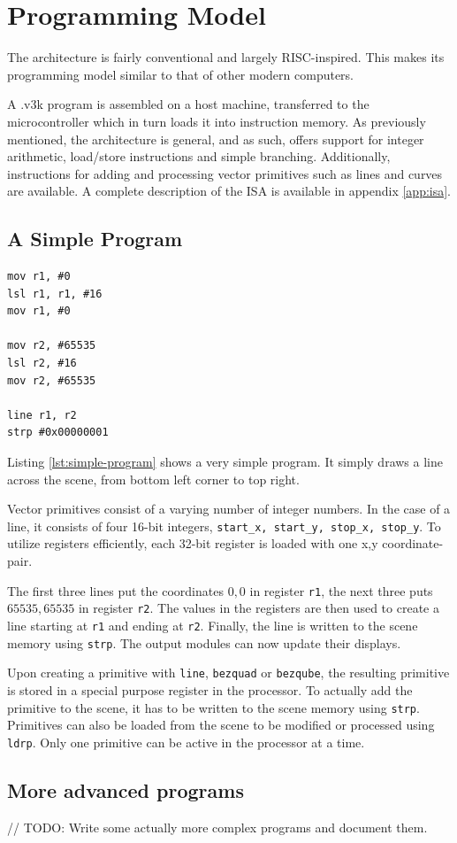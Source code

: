 \section{Programming Model}

The \vthreek architecture is fairly conventional and largely RISC-inspired.
This makes its programming model similar to that of other modern computers.

A .v3k program is assembled on a host machine, transferred to the microcontroller which in turn loads it into instruction memory.
As previously mentioned, the \vthreek architecture is general, and as such, offers support for integer arithmetic, load/store instructions and simple branching.
Additionally, instructions for adding and processing vector primitives such as lines and curves are available.
A complete description of the \vthreek ISA is available in appendix \ref{app:isa}.

\subsection{A Simple \vthreek Program}

\begin{lstlisting}[label=lst:simple-program]
mov r1, #0
lsl r1, r1, #16
mov r1, #0

mov r2, #65535
lsl r2, #16
mov r2, #65535

line r1, r2
strp #0x00000001
\end{lstlisting}

Listing \ref{lst:simple-program} shows a very simple \vthreek program.
It simply draws a line across the scene, from bottom left corner to top right.

Vector primitives consist of a varying number of integer numbers.
In the case of a line, it consists of four 16-bit integers, \texttt{start\_x, start\_y, stop\_x, stop\_y}.
To utilize registers efficiently, each 32-bit register is loaded with one x,y coordinate-pair.

The first three lines put the coordinates $0,0$ in register \texttt{r1}, the next three puts $65535,65535$ in register \texttt{r2}.
The values in the registers are then used to create a line starting at \texttt{r1} and ending at \texttt{r2}.
Finally, the line is written to the scene memory using \texttt{strp}.
The output modules can now update their displays.

Upon creating a primitive with \texttt{line}, \texttt{bezquad} or \texttt{bezqube}, the resulting primitive is stored in a special purpose register in the processor.
To actually add the primitive to the scene, it has to be written to the scene memory using \texttt{strp}.
Primitives can also be loaded from the scene to be modified or processed using \texttt{ldrp}.
Only one primitive can be active in the processor at a time.

\subsection{More advanced programs}

// TODO: Write some actually more complex programs and document them.
